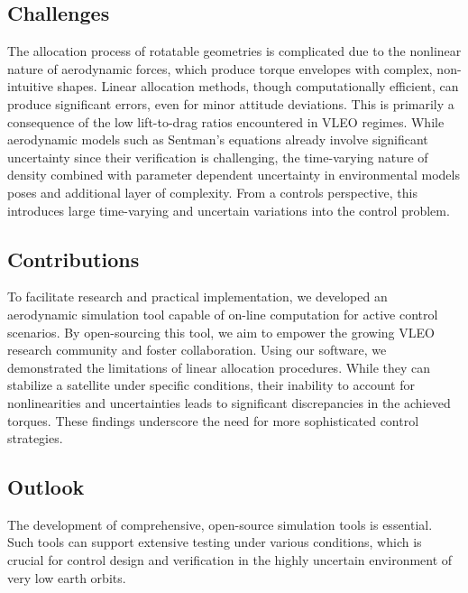 \documentclass[pdflatex,sn-mathphys-num]{sn-jnl}%
\theoremstyle{thmstyleone}%
\theoremstyle{thmstyletwo}%
\theoremstyle{thmstylethree}%
\begin{document}
	\subsection{Challenges}
	The allocation process of rotatable geometries is complicated due to the nonlinear nature of aerodynamic forces, which produce torque envelopes with complex, non-intuitive shapes.
	Linear allocation methods, though computationally efficient, can produce significant errors, even for minor attitude deviations. This is primarily a consequence of the low lift-to-drag ratios encountered in VLEO regimes.
	While aerodynamic models such as Sentman's equations already involve significant uncertainty since their verification is challenging, the time-varying nature of density combined with parameter dependent uncertainty in environmental models poses and additional layer of complexity. From a controls perspective, this introduces large time-varying and uncertain variations into the control problem.

	\subsection{Contributions}
	To facilitate research and practical implementation, we developed an aerodynamic simulation tool capable of on-line computation for active control scenarios. By open-sourcing this tool, we aim to empower the growing VLEO research community and foster collaboration.
	Using our software, we demonstrated the limitations of linear allocation procedures. While they can stabilize a satellite under specific conditions, their inability to account for nonlinearities and uncertainties leads to significant discrepancies in the achieved torques. These findings underscore the need for more sophisticated control strategies.

	\subsection{Outlook}
	The development of comprehensive, open-source simulation tools is essential. Such tools can support extensive testing under various conditions, which is crucial for control design and verification in the highly uncertain environment of very low earth orbits.
\end{document}
